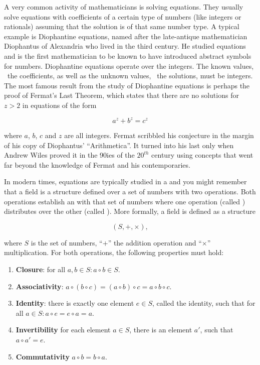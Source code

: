 \documentclass[tikz]{scrreprt}
\begin{document}
A very common activity of mathematicians is solving equations.
They usually solve equations with
coefficients of a certain type of numbers 
(like integers or rationals)
assuming that the solution
is of that same number type. 
A typical example is Diophantine equations,
named after the late-antique mathematician 
Diophantus of Alexandria who lived in the third century.
He studied equations and is the first mathematician
to be known to have introduced abstract symbols for numbers.
Diophantine equations operate over the integers.
The known values, \ie\ the coefficients, as well as the
unknown values, \ie\ the solutions, must be integers.
The most famous result from the study of Diophantine
equations is perhaps the proof of Fermat's Last Theorem,
which states that there are no solutions for $z>2$ in
equations of the form

\begin{equation} 
a^z + b^z = c^z
\end{equation} 

where $a$, $b$, $c$ and $z$ are all integers.
Fermat scribbled his conjecture
in the margin of his copy of Diophantus' ``Arithmetica''.
It turned
into his last  only when Andrew Wiles
proved it in the 90ies of the $20^{th}$ century
using concepts that went far beyond the knowledge
of Fermat and his contemporaries.

In modern times, equations are typically studied
in a  and you might remember that a field
is a structure defined over a set of numbers with
two operations. Both operations establish an 
with that set of numbers where one operation
(called ) distributes over
the other (called ).
More formally, a field is defined as a structure

\[
(S,+,\times),
\]

where $S$ is the set of numbers, ``$+$'' the addition
operation and ``$\times$'' multiplication.
For both operations, the following properties must hold: 

\begin{enumerate}
\item \textbf{Closure}: 
      for all $a,b \in S: a \circ b \in S$.
      
\item \textbf{Associativity}:
      $a \circ (b \circ c) = (a \circ b) \circ c = a \circ b \circ c$.

\item \textbf{Identity}:
      there is exactly one element $e \in S$, called the identity, such that
      for all $a \in S: a \circ e = e \circ a = a$.

\item \textbf{Invertibility}
      for each element $a \in S$, there is an element $a'$,
      such that $a \circ a' = e$.
      
\item \textbf{Commutativity}
      $a \circ b = b \circ a$.
\end{enumerate}
\end{document}
